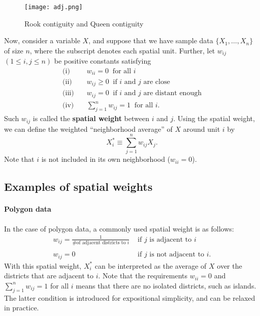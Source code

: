 \documentclass[11pt, A4paper, openany, uplatex]{book}
\begin{document}
\begin{figure}[h!]
	\begin{center}
		\texttt{[image: adj.png]}
		\caption{Rook contiguity and Queen contiguity\label{fig:contiguity}}
	\end{center}
\end{figure}

Now, consider a variable $X$, and suppose that we have sample data $\{X_1, \ldots, X_n\}$ of size $n$, where the subscript denotes each spatial unit.
Further, let $w_{ij}$ $(1 \le i,j \le n)$ be positive constants satisfying
\begin{align*}
\text{(i)} & \quad w_{ii} = 0  \;\; \text{for all $i$}\\
\text{(ii)} &\quad  w_{ij} \ge 0 \;\; \text{if $i$ and $j$ are close}\\
\text{(iii)} &\quad  w_{ij} = 0 \;\; \text{if $i$ and $j$ are distant enough}\\
\text{(iv)} &\quad  \sum_{j = 1}^n w_{ij} =1 \;\; \text{for all $i$}.
\end{align*} 
Such $w_{ij}$ is called the \textbf{spatial weight} between $i$ and $j$.
Using the spatial weight, we can define the weighted ``neighborhood average'' of $X$ around unit $i$ by
\[
	X_i^* \equiv \sum_{j=1}^n w_{ij} X_j.
\]
Note that $i$ is not included in its own neighborhood ($w_{ii} = 0$).

\subsection*{Examples of spatial weights}
\paragraph{Polygon data}
In the case of polygon data, a commonly used spatial weight is as follows:
\[
	\begin{array}{ll}
	w_{ij} = \frac{1}{\text{\# of adjacent districts to $i$}}& \text{ if $j$ is adjacent to $i$} \\
	& \\
	w_{ij} = 0 &  \text{ if $j$ is not adjacent to $i$.} 
	\end{array}
\]
With this spatial weight, $X_i^*$ can be interpreted as the average of $X$ over the districts that are adjacent to $i$.
Note that the requirements $w_{ii} = 0$ and $\sum_{j = 1}^n w_{ij} =1$ for all $i$ means that there are no isolated districts, such as islands.
The latter condition is introduced for expositional simplicity, and can be relaxed in practice.
\end{document}
